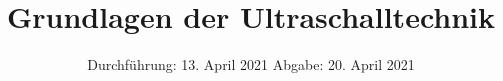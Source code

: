 

\subject{US1}
\title{Grundlagen der Ultraschalltechnik}
\date{%
  Durchführung: 13. April 2021
  \hspace{3em}
  Abgabe: 20. April 2021
}



\maketitle
\thispagestyle{empty}
\tableofcontents
\newpage






\printbibliography{}


